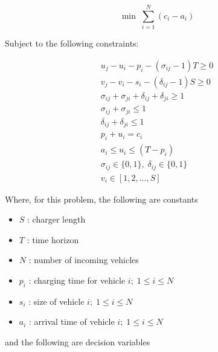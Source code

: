 \documentclass[letterpaper, 10pt, conference]{IEEEtran}
\begin{document}
\begin{equation}
	\label{eq:bapobjective}
	\min\; \sum_{i=1}^N (c_i - a_i)
\end{equation}

Subject to the following constraints:

\begin{subequations}
\label{eq:bapconstrs}
\begin{align}
    u_j - u_i - p_i - (\sigma_{ij} - 1)T \geq 0                 \label{subeq:baptime}         \\
    v_j - v_i - s_i - (\delta_{ij} - 1)S \geq 0                 \label{subeq:bapspace}        \\
    \sigma_{ij} + \sigma_{ji} + \delta_{ij} + \delta_{ji} \geq 1  \label{subeq:bapvalid_pos}    \\
    \sigma_{ij} + \sigma_{ji} \leq 1                            \label{subeq:bapsigma}        \\
    \delta_{ij} + \delta_{ji} \leq 1                            \label{subeq:bapdelta}        \\
    p_i + u_i = c_i                                            \label{subeq:bapdetach}       \\
    a_i \leq u_i \leq (T - p_i)                                \label{subeq:bapvalid_starts} \\
    \sigma_{ij} \in \{0,1\},\;\delta_{ij} \in \{0,1\}\;         \label{subeq:bapsdspace}      \\
    v_i \in [1,2,...,S]                                      \label{subeq:bapvspace}
\end{align}
\end{subequations}

\noindent
Where, for this problem, the following are constants

\begin{itemize}
	\item $S$   : charger length
	\item $T$   : time horizon
	\item $N$   : number of incoming vehicles
	\item $p_i$ : charging time for vehicle $i;\; 1 \leq i \leq N$
	\item $s_i$ : size of vehicle $i;\; 1 \leq i \leq N$
	\item $a_i$ : arrival time of vehicle $i;\; 1 \leq i \leq N$
\end{itemize}

\noindent
and the following are decision variables
\end{document}
